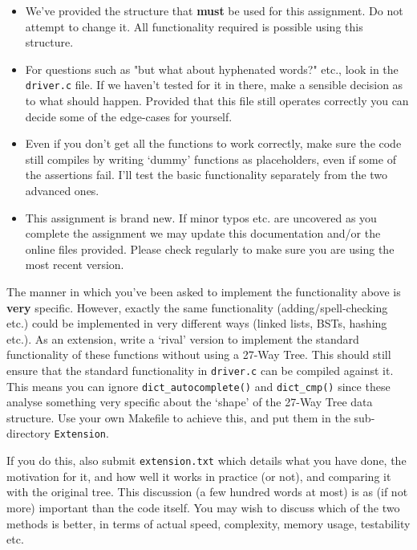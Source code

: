 \begin{exercise}
\begin{itemize}

\item We've provided the structure that {\bf must} be used for this
assignment.  Do not attempt to change it. All functionality required is
possible using this structure.

\item For questions such as "but what about hyphenated words?" etc., look
in the \verb^driver.c^ file. If we haven't tested for it in there, make a
sensible decision as to what should happen. Provided that this file still
operates correctly you can decide some of the edge-cases for yourself.

\item Even if you don't get all the functions to work correctly, make sure
the code still compiles by writing `dummy' functions as placeholders,
even if some of the assertions fail. I'll test the basic functionality
separately from the two advanced ones.

\item This assignment is brand new. If minor typos etc. are uncovered
as you complete the assignment we may update this documentation and/or
the online files provided. Please check regularly to make sure you are
using the most recent version.

\end{itemize}

\vspace*{1cm}
\vspace*{1ex}

\noindent The manner in which you've been asked to implement the
functionality above is {\bf very} specific. However, exactly the same
functionality (adding/spell-checking etc.)  could be implemented in very
different ways (linked lists, BSTs, hashing etc.).  As an extension,
write a `rival' version to implement the standard functionality of these
functions without using a 27-Way Tree.  This should still ensure that the
standard functionality in \verb^driver.c^ can be compiled against it. This
means you can ignore \verb^dict_autocomplete()^ and \verb^dict_cmp()^
since these analyse something very specific about the `shape' of the
27-Way Tree data structure.  Use your own Makefile to achieve this,
and put them in the sub-directory \verb^Extension^.

If you do this, also submit \verb^extension.txt^ which details what you
have done, the motivation for it, and how well it works in practice
(or not), and comparing it with the original tree.  This discussion
(a few hundred words at most) is as (if not more) important than the
code itself. You may wish to discuss which of the two methods is better,
in terms of actual speed, complexity, memory usage, testability etc.


\end{exercise}
